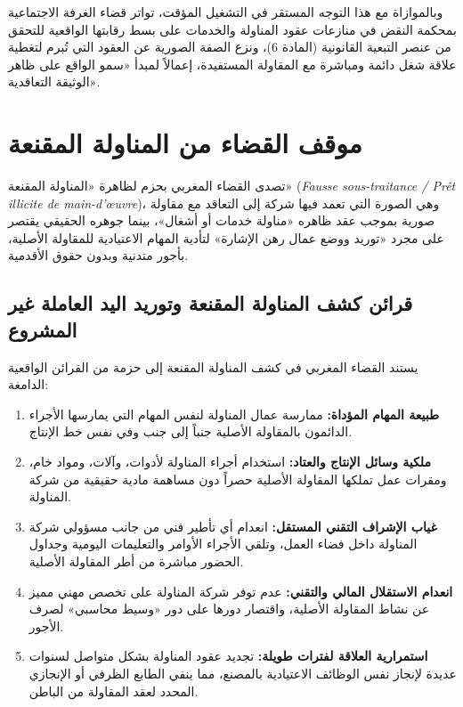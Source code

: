 وبالموازاة مع هذا التوجه المستقر في التشغيل المؤقت، تواتر قضاء الغرفة الاجتماعية بمحكمة النقض في منازعات عقود المناولة والخدمات على بسط رقابتها الواقعية للتحقق من عنصر التبعية القانونية (المادة \textenglish{6})، ونزع الصفة الصورية عن العقود التي تُبرم لتغطية علاقة شغل دائمة ومباشرة مع المقاولة المستفيدة، إعمالاً لمبدأ «سمو الواقع على ظاهر الوثيقة التعاقدية».

\section{موقف القضاء من المناولة المقنعة}

تصدى القضاء المغربي بحزم لظاهرة «المناولة المقنعة» (\textit{Fausse sous-traitance / Prêt illicite de main-d'œuvre})، وهي الصورة التي تعمد فيها شركة إلى التعاقد مع مقاولة صورية بموجب عقد ظاهره «مناولة خدمات أو أشغال»، بينما جوهره الحقيقي يقتصر على مجرد «توريد ووضع عمال رهن الإشارة» لتأدية المهام الاعتيادية للمقاولة الأصلية، بأجور متدنية وبدون حقوق الأقدمية.

\subsection{قرائن كشف المناولة المقنعة وتوريد اليد العاملة غير المشروع}
يستند القضاء المغربي في كشف المناولة المقنعة إلى حزمة من القرائن الواقعية الدامغة:
\begin{enumerate}[leftmargin=*, itemsep=5pt]
    \item \textbf{طبيعة المهام المؤداة:} ممارسة عمال المناولة لنفس المهام التي يمارسها الأجراء الدائمون بالمقاولة الأصلية جنباً إلى جنب وفي نفس خط الإنتاج.
    \item \textbf{ملكية وسائل الإنتاج والعتاد:} استخدام أجراء المناولة لأدوات، وآلات، ومواد خام، ومقرات عمل تملكها المقاولة الأصلية حصراً دون مساهمة مادية حقيقية من شركة المناولة.
    \item \textbf{غياب الإشراف التقني المستقل:} انعدام أي تأطير فني من جانب مسؤولي شركة المناولة داخل فضاء العمل، وتلقي الأجراء الأوامر والتعليمات اليومية وجداول الحضور مباشرة من أطر المقاولة الأصلية.
    \item \textbf{انعدام الاستقلال المالي والتقني:} عدم توفر شركة المناولة على تخصص مهني مميز عن نشاط المقاولة الأصلية، واقتصار دورها على دور «وسيط محاسبي» لصرف الأجور.
    \item \textbf{استمرارية العلاقة لفترات طويلة:} تجديد عقود المناولة بشكل متواصل لسنوات عديدة لإنجاز نفس الوظائف الاعتيادية بالمصنع، مما ينفي الطابع الظرفي أو الإنجازي المحدد لعقد المقاولة من الباطن.
\end{enumerate}

